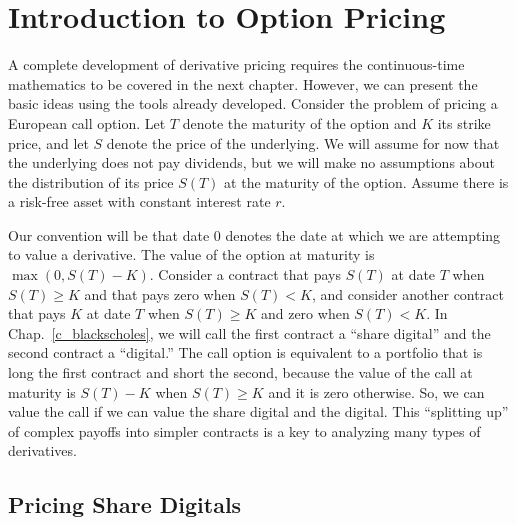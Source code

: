 \section{Introduction to Option Pricing}\label{s_introoptions}
A complete development of derivative pricing requires the continuous-time mathematics to be covered in the next chapter.  However, we can present the basic ideas using the tools already developed.  Consider the problem of pricing a European call option.  Let $T$ denote the maturity of the option and $K$ its strike price, and let $S$ denote the price of the underlying.  We will assume for now that the underlying does not pay dividends, but we will make no assumptions about the distribution of its price $S(T)$ at the maturity of the option.  Assume there is a risk-free asset with constant interest rate $r$.

Our convention will be that date 0 denotes the date at which we are attempting to value a derivative. 
The value of the option at maturity is $\max(0,S(T)-K)$.  Consider a contract that pays $S(T)$ at date $T$ when $S(T) \geq K$ and that pays zero when $S(T)<K$, and consider another contract that pays $K$ at date $T$ when $S(T)\geq K$ and zero when $S(T)<K$.  In Chap.~\ref{c_blackscholes}, we will call the first contract a ``share digital''  and the second contract a ``digital.''   The call option is equivalent to a portfolio that is long the first contract and short the second, because the value of the call at maturity is $S(T)-K$ when $S(T)\geq K$ and it is zero otherwise.  So, we can value the call if we can value the share digital and the digital.  This ``splitting up'' of complex payoffs into simpler contracts is a key to analyzing many types of derivatives.

\subsection*{Pricing Share Digitals}

